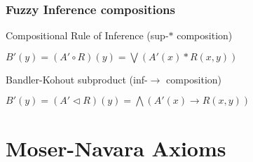 \documentclass{beamer}
\begin{document}

\begin{frame}
\frametitle{Fuzzy Inference compositions}
\begin{block}{Compositional Rule of Inference (sup-$\ast$ composition)}
\begin{center}
$B'(y) = (A' \circ R)(y) = \bigvee (A'(x) \ast R(x,y))$
\end{center}
\end{block}

\begin{block}{Bandler-Kohout subproduct (inf-$\rightarrow$ composition)}
\begin{center}
$B'(y) = (A' \vartriangleleft R)(y) = \bigwedge (A'(x) \rightarrow R(x,y))$
\end{center}
\end{block}
\end{frame}

\section{Moser-Navara Axioms} %

\end{document}
